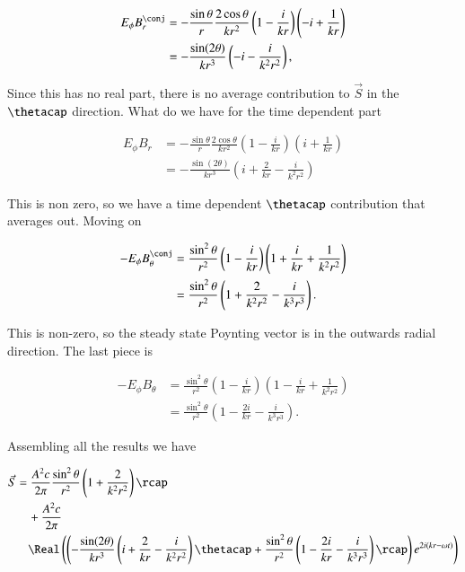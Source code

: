 \begin{align*}
E_\phi B_r^\conj &=
- \frac{\sin\theta}{r} \frac{2 \cos\theta}{k r^2} 
\left( 1 - \frac{i}{k r} \right)
\left( -i + \frac{1}{k r} \right) \\
&=
-\frac{ \sin(2\theta)}{k r^3}
\left( -i - \frac{i}{k^2 r^2} \right),
\end{align*}

Since this has no real part, there is no average contribution to $\vec{S}$ in the $\thetacap$ direction.  What do we have for the time dependent part

\begin{align*}
E_\phi B_r &=
- \frac{\sin\theta}{r} \frac{2 \cos\theta}{k r^2} 
\left( 1 - \frac{i}{k r} \right)
\left( i + \frac{1}{k r} \right) \\
&=
-\frac{ \sin(2\theta)}{k r^3}
\left( i + \frac{2}{k r} - \frac{i}{k^2 r^2} \right) 
\end{align*}

This is non zero, so we have a time dependent $\thetacap$ contribution that averages out.  Moving on

\begin{align*}
- E_\phi B_\theta^\conj
&= 
\frac{\sin^2\theta}{r^2} 
\left( 1 - \frac{i}{k r} \right)
\left( 1 + \frac{i}{k r} + \frac{1}{k^2 r^2} \right) \\
&= 
\frac{\sin^2\theta}{r^2} 
\left( 1 + \frac{2}{k^2 r^2} - \frac{i}{k^3 r^3}\right).
\end{align*}

This is non-zero, so the steady state Poynting vector is in the outwards radial direction.  The last piece is

\begin{align*}
- E_\phi B_\theta
&= 
\frac{\sin^2\theta}{r^2} 
\left( 1 - \frac{i}{k r} \right)
\left( 1 - \frac{i}{k r} + \frac{1}{k^2 r^2} \right) \\
&= 
\frac{\sin^2\theta}{r^2} 
\left( 1 - \frac{2i}{k r} - \frac{i}{k^3 r^3}\right).
\end{align*}

Assembling all the results we have

\begin{align*}
\begin{aligned}
\vec{S} 
&= 
\frac{A^2 c}{2 \pi} 
\frac{\sin^2\theta}{r^2} 
\left( 1 + \frac{2}{k^2 r^2} \right) \rcap \\
&\quad +
\frac{A^2 c}{2 \pi}  \\
&\quad \Real \left(
\left(
-\frac{ \sin(2\theta)}{k r^3} \left( i + \frac{2}{k r} - \frac{i}{k^2 r^2} \right) \thetacap
+\frac{\sin^2\theta}{r^2} \left( 1 - \frac{2i}{k r} - \frac{i}{k^3 r^3}\right) \rcap 
\right) e^{ 2 i ( k r - \omega t ) }
\right) 
\end{aligned}
\end{align*}

